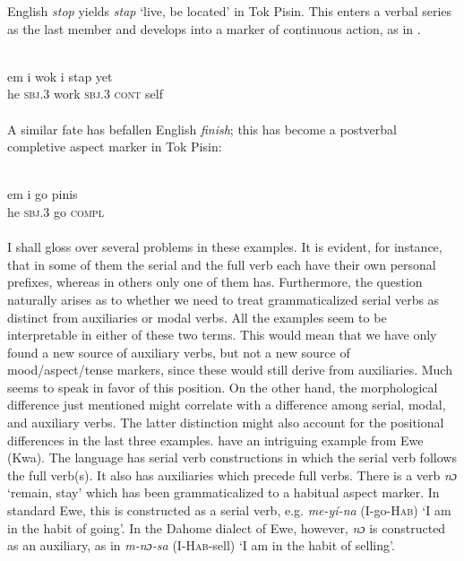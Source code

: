English \textit{stop} yields \textit{stap} ‘live, be located’ in Tok Pisin. This enters a verbal series as the last member and develops into a marker of continuous action, as in .

\ea\label{ex:E8}
\\
\gll em  i  wok  i  stap  yet\\
 he  \textsc{sbj}.3  work  \textsc{sbj}.3  \textsc{cont}  self\\
\\
\z
\noindent A similar fate has befallen English \textit{finish}; this has become a postverbal completive aspect marker in Tok Pisin:

\ea\label{ex:}
 \\
\gll em  i  go  pinis\\
he  \textsc{sbj}.3  go  \textsc{compl}\\
\\
\z
\noindent I shall gloss over several problems in these examples. It is evident, for instance, that in some of them the serial and the full verb each have their own personal prefixes, whereas in others only one of them has. Furthermore, the question naturally arises as to whether we need to treat grammaticalized serial verbs as distinct from auxiliaries or modal verbs. All the examples seem to be interpretable in either of these two terms. This would mean that we have only found a new source of auxiliary verbs, but not a new source of mood/aspect/tense markers, since these would still derive from auxiliaries. Much seems to speak in favor of this position. On the other hand, the morphological difference just mentioned might correlate with a difference among serial, modal, and auxiliary verbs. The latter distinction might also account for the positional differences in the last three examples. \citet[128]{HeineEtAl1984} have an intriguing example from Ewe (Kwa). The language has serial verb constructions in which the serial verb follows the full verb(s). It also has auxiliaries which precede full verbs. There is a verb \textit{nɔ} ‘remain, stay’ which has been grammaticalized to a habitual aspect marker. In standard Ewe, this is constructed as a serial verb, e.g. \textit{me-yí-na} (I-go-\textsc{Hab}) ‘I am in the habit of going’. In the Dahome dialect of Ewe, however, \textit{nɔ} is constructed as an auxiliary, as in \textit{m-nɔ-sa} (I-\textsc{Hab}{}-sell) ‘I am in the habit of selling’.

